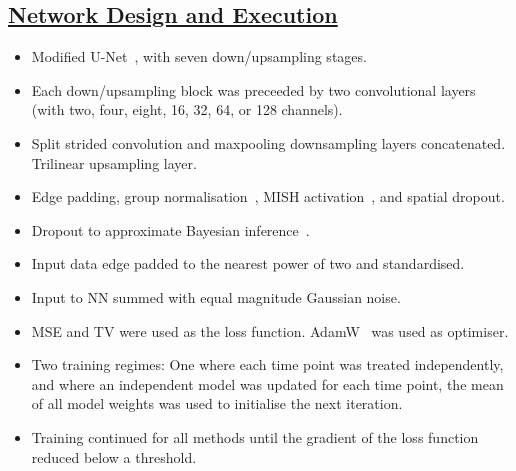 \documentclass[portrait, color=UCLburgundy, margin=1cm]{uclposter}
\begin{document}
\begin{multicols}{2}
            \subsection*{\underline{\textbf{Network Design and Execution}}}
                \begin{itemize}
                    \item Modified U-Net~\cite{Weng2015U-Net:Segmentation}, with seven down/upsampling stages.
                    \item Each down/upsampling block was preceeded by two convolutional layers (with two, four, eight, 16, 32, 64, or 128 channels).
                    \item Split strided convolution and maxpooling downsampling layers concatenated. Trilinear upsampling layer.
                    \item Edge padding, group normalisation~\cite{Wu2018GroupNormalization}, MISH activation~\cite{Misra2020Mish:Function}, and spatial dropout.
                    \item Dropout to approximate Bayesian inference~\cite{Gal2015DropoutLearning}.
                    \item Input data edge padded to the nearest power of two and standardised.
                    \item Input to \gls{NN} summed with equal magnitude Gaussian noise.
                    \item \acrlong{MSE} and \gls{TV} were used as the loss function. AdamW~\cite{Loshchilov2017DecoupledRegularization} was used as optimiser.
                    \item Two training regimes: One where each time point was treated independently, and where an independent model was updated for each time point, the mean of all model weights was used to initialise the next iteration.
                    \item Training continued for all methods until the gradient of the loss function reduced below a threshold.
                \end{itemize}
            

\end{multicols}
\end{document}
